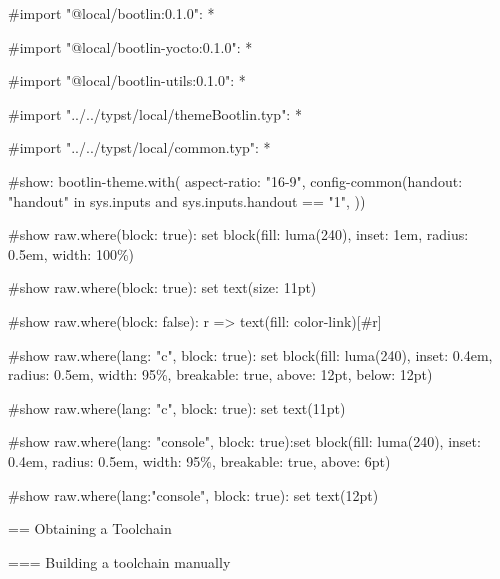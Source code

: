 #import "@local/bootlin:0.1.0": *

#import "@local/bootlin-yocto:0.1.0": *

#import "@local/bootlin-utils:0.1.0": *

#import "../../typst/local/themeBootlin.typ": *

#import "../../typst/local/common.typ": *

#show: bootlin-theme.with( aspect-ratio: "16-9", config-common(handout: "handout" in sys.inputs and sys.inputs.handout == "1", ))

#show raw.where(block: true): set block(fill: luma(240), inset: 1em, radius: 0.5em, width: 100\%)

#show raw.where(block: true): set text(size: 11pt)

#show raw.where(block: false): r => text(fill: color-link)[#r]

#show raw.where(lang: "c", block: true): set block(fill: luma(240), inset: 0.4em, radius: 0.5em, width: 95\%, breakable: true, above: 12pt, below: 12pt)

#show raw.where(lang: "c", block: true): set text(11pt)

#show raw.where(lang: "console", block: true):set block(fill: luma(240), inset: 0.4em, radius: 0.5em, width: 95\%, breakable: true, above: 6pt)

#show raw.where(lang:"console", block: true): set text(12pt)

 == Obtaining a Toolchain

=== Building a toolchain manually

